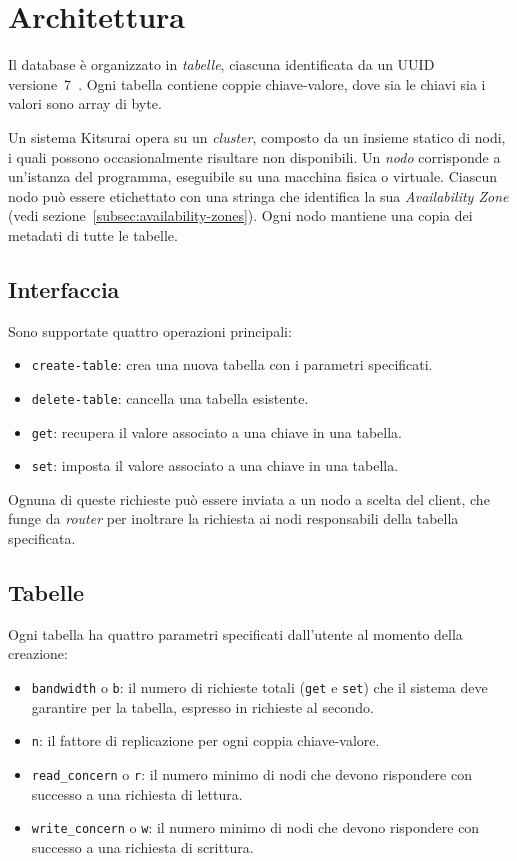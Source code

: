 \section{Architettura}
\label{sec:architettura}

Il database è organizzato in \emph{tabelle}, ciascuna identificata da un UUID versione~7~\cite{rfc9562}.
Ogni tabella contiene coppie chiave-valore, dove sia le chiavi sia i valori sono array di byte.

Un sistema Kitsurai opera su un \emph{cluster}, composto da un insieme statico di nodi, i quali possono occasionalmente risultare non disponibili.
Un \emph{nodo} corrisponde a un'istanza del programma, eseguibile su una macchina fisica o virtuale.
Ciascun nodo può essere etichettato con una stringa che identifica la sua \emph{Availability Zone} (vedi sezione~\ref{subsec:availability-zones}).
Ogni nodo mantiene una copia dei metadati di tutte le tabelle.

\subsection{Interfaccia}
\label{subsec:interfaccia}

Sono supportate quattro operazioni principali:
\begin{itemize}
    \item \texttt{create-table}: crea una nuova tabella con i parametri specificati.
    \item \texttt{delete-table}: cancella una tabella esistente.
    \item \texttt{get}: recupera il valore associato a una chiave in una tabella.
    \item \texttt{set}: imposta il valore associato a una chiave in una tabella.
\end{itemize}

Ognuna di queste richieste può essere inviata a un nodo a scelta del client, che funge da \emph{router} per inoltrare la richiesta ai nodi responsabili della tabella specificata.

\subsection{Tabelle}
\label{subsec:tabelle}

Ogni tabella ha quattro parametri specificati dall'utente al momento della creazione:
\begin{itemize}
    \item \texttt{bandwidth} o \texttt{b}: il numero di richieste totali (\texttt{get} e \texttt{set}) che il sistema deve garantire per la tabella, espresso in richieste al secondo.
    \item \texttt{n}: il fattore di replicazione per ogni coppia chiave-valore.
    \item \texttt{read\_concern} o \texttt{r}: il numero minimo di nodi che devono rispondere con successo a una richiesta di lettura.
    \item \texttt{write\_concern} o \texttt{w}: il numero minimo di nodi che devono rispondere con successo a una richiesta di scrittura.
\end{itemize}

